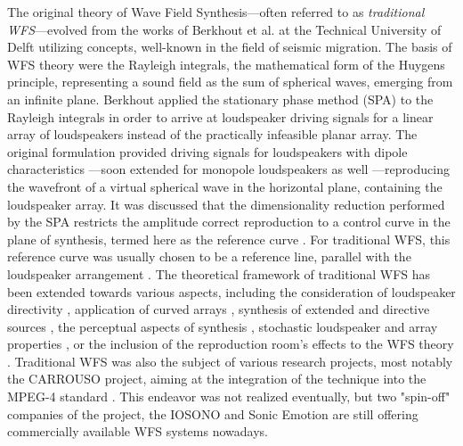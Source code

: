 The original theory of Wave Field Synthesis---often referred to as \emph{traditional WFS}---evolved from the works of Berkhout et al. at the Technical University of Delft utilizing concepts, well-known in the field of seismic migration.%
The basis of WFS theory were the Rayleigh integrals, the mathematical form of the Huygens principle, representing a sound field as the sum of spherical waves, emerging from an infinite plane.
Berkhout applied the stationary phase method (SPA) to the Rayleigh integrals in order to arrive at loudspeaker driving signals for a linear array of loudspeakers instead of the practically infeasible planar array.
The original formulation provided driving signals for loudspeakers with dipole characteristics \cite{Berkhout1988, Berkhout1993:Acoustic_control_by_WFS}---soon extended for monopole loudspeakers as well \cite{doi:10.1121/1.404755, Vogel1993:phd, devries1994the, Start1997:phd, Verheijen1997:phd, deBrujin2004}---reproducing the wavefront of a virtual spherical wave in the horizontal plane, containing the loudspeaker array.
It was discussed that the dimensionality reduction performed by the SPA restricts the amplitude correct reproduction to a control curve in the plane of synthesis, termed here as the reference curve \cite{sonke1998variable}.
For traditional WFS, this reference curve was usually chosen to be a reference line, parallel with the loudspeaker arrangement \cite{start1996application, Start1997:phd}.
The theoretical framework of traditional WFS has been extended towards various aspects, including the consideration of loudspeaker directivity \cite{devries1996sound, Firtha2012:isma}, application of curved arrays \cite{start1996application}, synthesis of extended and directive sources \cite{Corteel2007, Baalman2008:phd}, the perceptual aspects of synthesis \cite{Hulsebos2004:phd, wittek2004spatial, strauss2004generation, Corteel2006:phd, Wittek2007:phd}, stochastic loudspeaker and array properties \cite{Firtha2013:daga, Firtha2013:internoise}, or the inclusion of the reproduction room's effects to the WFS theory \cite{spors2003an, corteel2003listening, 1326755, buchner2004efficient, petrausch2005simulation}.
Traditional WFS was also the subject of various research projects, most notably the CARROUSO project, aiming at the integration of the technique into the MPEG-4 standard \cite{sporer2001carrouso}. 
This endeavor was not realized eventually, but two "spin-off" companies of the project, the IOSONO and Sonic Emotion are still offering commercially available WFS systems nowadays.

